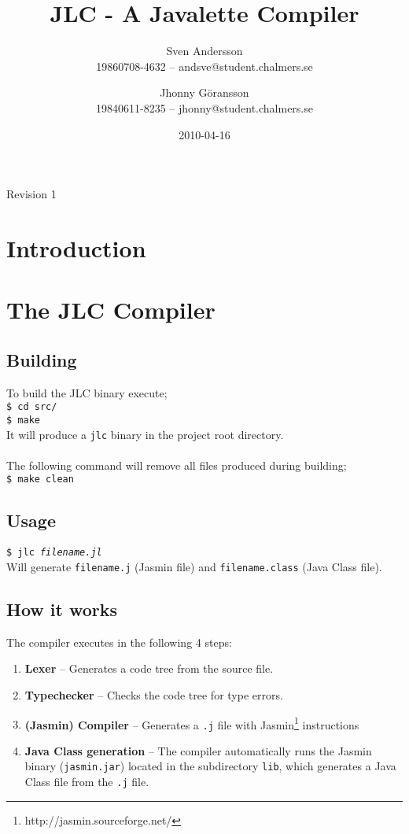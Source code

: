 \documentclass[]{article}
\title{JLC - A Javalette Compiler}
\author{Sven Andersson\\19860708-4632 -- andsve@student.chalmers.se
        \and Jhonny Göransson\\19840611-8235 -- jhonny@student.chalmers.se}
\date{2010-04-16}
\begin{document}
\ifpdf
{}
\else
{}
\fi

\maketitle
\begin{center}
  Revision 1
\end{center}



\section{Introduction}

\section{The JLC Compiler}
  \subsection*{Building}
    To build the JLC binary execute;\\
    \texttt{\$ cd src/}\\
    \texttt{\$ make}\\
    It will produce a \texttt{jlc} binary in the project root directory.\\
    \\
    The following command will remove all files produced during building;\\
    \texttt{\$ make clean}

  \subsection*{Usage}
    \texttt{\$ jlc \textit{filename.jl}}\\
    Will generate \texttt{filename.j} (Jasmin file) and \texttt{filename.class} (Java Class file).
  
  \subsection*{How it works}
    The compiler executes in the following 4 steps:
    \begin{enumerate}
      \item \textbf{Lexer} -- Generates a code tree from the source file.
      \item \textbf{Typechecker} -- Checks the code tree for type errors.
      \item \textbf{(Jasmin) Compiler} -- Generates a \texttt{.j} file with Jasmin\footnote{http://jasmin.sourceforge.net/} instructions
      \item \textbf{Java Class generation} -- The compiler automatically runs the Jasmin binary (\texttt{jasmin.jar}) located in the subdirectory \texttt{lib}, which generates a Java Class file from the \texttt{.j} file.
    \end{enumerate}
\end{document}
